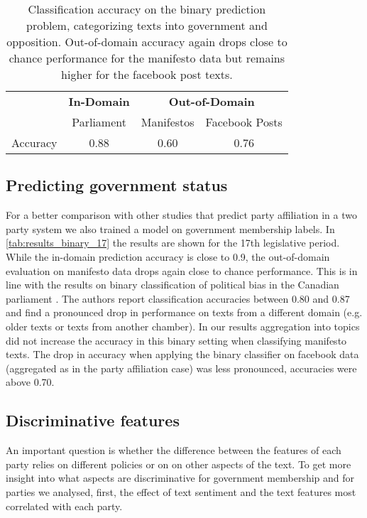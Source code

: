 \documentclass[11pt]{article}
\begin{document}
\begin{table*}[t]
\caption{
\label{tab:results_binary_17}
Classification accuracy on the binary prediction problem, categorizing texts into government and opposition. Out-of-domain accuracy again drops close to chance performance for the manifesto data but remains higher for the facebook post texts. 
}
\begin{center}
\begin{tabular}{lccc}
& {\bf In-Domain} & \multicolumn{2}{c}{{\bf Out-of-Domain}}\\
& Parliament & Manifestos & Facebook Posts\\
\hline
Accuracy    &   0.88   &   0.60&      0.76\\
%
\end{tabular}
\end{center}
\end{table*}

\subsection{Predicting government status}\label{sec:sentiment_result}
For a better comparison with other studies that predict party affiliation in a two party system we also trained a model on government membership labels. In \autoref{tab:results_binary_17} the results are shown for the 17th legislative period. While the in-domain prediction accuracy is close to 0.9, the out-of-domain evaluation on manifesto data drops again close to chance performance. This is in line with the results on binary classification of political bias in the Canadian parliament \cite{Yu2008}. The authors report classification accuracies between 0.80 and 0.87 and find a pronounced drop in performance on texts from a different domain (e.g. older texts or texts from another chamber). In our results aggregation into topics did not increase the accuracy in this binary setting when classifying manifesto texts. The drop in accuracy when applying the binary classifier on facebook data (aggregated as in the party affiliation case) was less pronounced, accuracies were above 0.70. 

\subsection{Discriminative features}
\label{sec:discrim_effect}
An important question is whether the difference between the features of each party relies on different policies or on on other aspects of the text. To get more insight into what aspects are discriminative for government membership and for parties we analysed, first, the effect of text sentiment and the text features most correlated with each party.
\end{document}
